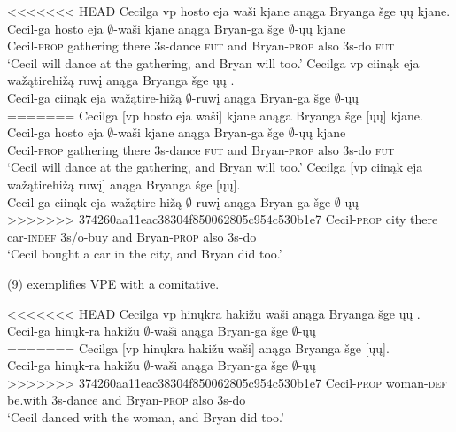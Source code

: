 \documentclass[output=paper]{LSP/langsci}
\begin{document}
\begin{exe}
\ex
\begin{xlist}
\ex
<<<<<<< HEAD
\glll Cecilga {\ob}{vp} hosto eja waši{\cb} kjane anąga Bryanga šge {\ob}ųų{\cb} kjane.\\
Cecil-ga {} hosto eja $\emptyset$-waši kjane anąga Bryan-ga šge $\emptyset$-ųų kjane\\
Cecil-\textsc{prop} {} gathering there {\textsc 3s}-dance \textsc{fut} and Bryan-\textsc{prop} also {\textsc 3s}-do \textsc{fut}\\
\trans `Cecil will dance at the gathering, and Bryan will too.'
\ex
\glll Cecilga {\ob}{vp} ciinąk eja wažątirehižą ruwį{\cb} anąga Bryanga šge {\ob}ųų{\cb} .\\
Cecil-ga {} ciinąk eja wažątire-hižą $\emptyset$-ruwį anąga Bryan-ga šge $\emptyset$-ųų\\
=======
\glll Cecilga {\textsc [vp} hosto eja wa\v{s}i{\textsc ]} kjane an\k{a}ga Bryanga \v{s}ge {\textsc [}\k{u}\k{u}{\textsc ]} kjane.\\
Cecil-ga {} hosto eja $\emptyset$-wa\v{s}i kjane an\k{a}ga Bryan-ga \v{s}ge $\emptyset$-\k{u}\k{u} kjane\\
Cecil-\textsc{prop} {} gathering there {\textsc 3s}-dance \textsc{fut} and Bryan-\textsc{prop} also {\textsc 3s}-do \textsc{fut}\\
\trans `Cecil will dance at the gathering, and Bryan will too.'
\ex
\glll Cecilga {\textsc [vp} ciin\k{a}k eja wa\v{z}\k{a}tirehi\v{z}\k{a} ruw\k{i}{\textsc ]} an\k{a}ga Bryanga \v{s}ge {\textsc [}\k{u}\k{u}{\textsc ]}.\\
Cecil-ga {} ciin\k{a}k eja wa\v{z}\k{a}tire-hi\v{z}\k{a} $\emptyset$-ruw\k{i} an\k{a}ga Bryan-ga \v{s}ge $\emptyset$-\k{u}\k{u}\\
>>>>>>> 374260aa11eac38304f850062805c954c530b1e7
Cecil-\textsc{prop} {} city there car-\textsc{indef} {\textsc 3s/o}-buy and Bryan-\textsc{prop} also {\textsc 3s}-do\\
\trans `Cecil bought a car in the city, and Bryan did too.'
\end{xlist}
\end{exe}

(9) exemplifies VPE with a comitative.

\begin{exe}
\ex
<<<<<<< HEAD
\glll Cecilga {\ob}{vp} hinųkra hakižu waši{\cb} anąga Bryanga šge {\ob}ųų{\cb} .\\
Cecil-ga {} hinųk-ra hakižu $\emptyset$-waši anąga Bryan-ga šge $\emptyset$-ųų\\
=======
\glll Cecilga {\textsc [vp} hin\k{u}kra haki\v{z}u wa\v{s}i{\textsc ]} an\k{a}ga Bryanga \v{s}ge {\textsc [}\k{u}\k{u}{\textsc ]}.\\
Cecil-ga {} hin\k{u}k-ra haki\v{z}u $\emptyset$-wa\v{s}i an\k{a}ga Bryan-ga \v{s}ge $\emptyset$-\k{u}\k{u}\\
>>>>>>> 374260aa11eac38304f850062805c954c530b1e7
Cecil-\textsc{prop} {} woman-\textsc{def} be.with {\textsc 3s}-dance and Bryan-\textsc{prop} also {\textsc 3s}-do\\
\trans `Cecil danced with the woman, and Bryan did too.'
\end{exe}
\end{document}
